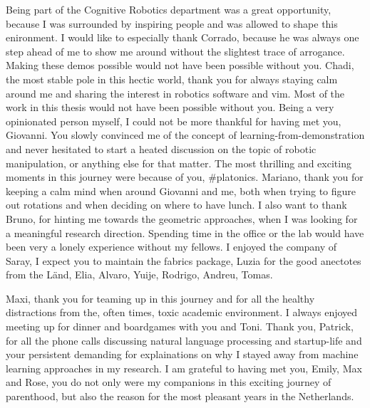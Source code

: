 Being part of the Cognitive Robotics department was a great opportunity,
because I was surrounded by inspiring people and was allowed to shape this
enironment. I would like to especially thank Corrado, because he was always one
step ahead of me to show me around without the slightest trace of arrogance.
Making these demos possible would not have been possible without you. Chadi,
the most stable pole in this hectic world, thank you for always staying calm
around me and sharing the interest in robotics software and vim. Most of the
work in this thesis would not have been possible without you. Being a very
opinionated person myself, I could not be more thankful for having met you,
Giovanni. You slowly convinced me of the concept of learning-from-demonstration
and never hesitated to start a heated discussion on the topic of robotic
manipulation, or anything else for that matter. The most thrilling and exciting
moments in this journey were because of you, \#platonics. Mariano, thank you for
keeping a calm mind when around Giovanni and me, both when trying to figure out
rotations and when deciding on where to have lunch. I also want to thank Bruno,
for hinting me towards the geometric approaches, when I was looking for a
meaningful research direction. Spending time in the office or the lab would
have been very a lonely experience without my fellows. I enjoyed the company of
Saray, I expect you to maintain the fabrics package, Luzia for the good
anectotes from the Länd, Elia, Alvaro, Yuije, Rodrigo, Andreu, Tomas.

Maxi, thank you for teaming up in this journey and for all the healthy
distractions from the, often times, toxic academic environment. I always
enjoyed meeting up for dinner and boardgames with you and Toni. Thank you,
Patrick, for all the phone calls discussing natural language processing and
startup-life and your persistent demanding for explainations on why I stayed
away from machine learning approaches in my research. I am grateful to having
met you, Emily, Max and Rose, you do not only were my companions in this
exciting journey of parenthood, but also the reason for the most pleasant years
in the Netherlands.

